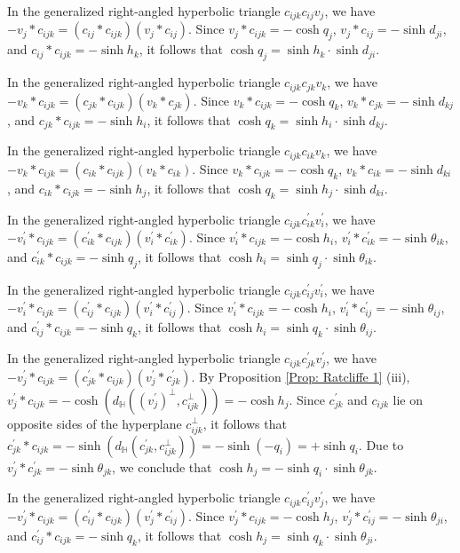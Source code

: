 \documentclass[12pt]{amsart}
\theoremstyle{definition}
\begin{document}
\begin{description}
In the generalized right-angled hyperbolic triangle $c_{ijk}c_{ij}v_j$,
we have $-v_j\ast c_{ijk}=(c_{ij}\ast c_{ijk})(v_j\ast c_{ij})$.
Since $v_j\ast c_{ijk}=-\cosh q_j$,
$v_j\ast c_{ij}=-\sinh d_{ji}$,
and $c_{ij}\ast c_{ijk}=-\sinh h_k$,
it follows that $\cosh q_j=\sinh h_k\cdot \sinh d_{ji}$.

In the generalized right-angled hyperbolic triangle $c_{ijk}c_{jk}v_k$,
we have $-v_k\ast c_{ijk}=(c_{jk}\ast c_{ijk})(v_k\ast c_{jk})$.
Since $v_k\ast c_{ijk}=-\cosh q_k$,
$v_k\ast c_{jk}=-\sinh d_{kj}$,
and $c_{jk}\ast c_{ijk}=-\sinh h_i$,
it follows that $\cosh q_k=\sinh h_i\cdot \sinh d_{kj}$.

In the generalized right-angled hyperbolic triangle $c_{ijk}c_{ik}v_k$,
we have $-v_k\ast c_{ijk}=(c_{ik}\ast c_{ijk})(v_k\ast c_{ik})$.
Since $v_k\ast c_{ijk}=-\cosh q_k$,
$v_k\ast c_{ik}=-\sinh d_{ki}$, and
$c_{ik}\ast c_{ijk}=-\sinh h_j$,
it follows that $\cosh q_k=\sinh h_j\cdot\sinh d_{ki}$.

In the generalized right-angled hyperbolic triangle $c_{ijk}c^\prime_{ik}v^\prime_i$,
we have $-v^\prime_i\ast c_{ijk}=(c^\prime_{ik}\ast c_{ijk})(v^\prime_i\ast c^\prime_{ik})$.
Since $v^\prime_i\ast c_{ijk}=-\cosh h_i$,
$v^\prime_i\ast c^\prime_{ik}=-\sinh \theta_{ik}$, and
$c^\prime_{ik}\ast c_{ijk}=-\sinh q_j$,
it follows that $\cosh h_i=\sinh q_j\cdot\sinh \theta_{ik}$.

In the generalized right-angled hyperbolic triangle $c_{ijk}c^\prime_{ij}v^\prime_i$,
we have $-v^\prime_i\ast c_{ijk}=(c^\prime_{ij}\ast c_{ijk})(v^\prime_i\ast c^\prime_{ij})$.
Since $v^\prime_i\ast c_{ijk}=-\cosh h_i$,
$v^\prime_i\ast c^\prime_{ij}=-\sinh \theta_{ij}$, and
$c^\prime_{ij}\ast c_{ijk}=-\sinh q_k$,
it follows that $\cosh h_i=\sinh q_k\cdot\sinh \theta_{ij}$.

In the generalized right-angled hyperbolic triangle $c_{ijk}c^\prime_{jk}v^\prime_j$,
we have $-v^\prime_j\ast c_{ijk}=(c^\prime_{jk}\ast c_{ijk})(v^\prime_j\ast c^\prime_{jk})$.
By Proposition \ref{Prop: Ratcliffe 1} (iii),
$v^\prime_j\ast c_{ijk}
=-\cosh(d_\mathbb{H}((v^\prime_j)^\bot,c_{ijk}^\bot))
=-\cosh h_j$.
Since $c^\prime_{jk}$ and $c_{ijk}$ lie on opposite sides of the hyperplane $c_{ijk}^\bot$, 
it follows that $c^\prime_{jk}\ast c_{ijk}=-\sinh(d_\mathbb{H}(c^\prime_{jk},c_{ijk}^\bot))=-\sinh (-q_i)=+\sinh q_i$.
Due to $v^\prime_j\ast c^\prime_{jk}=-\sinh \theta_{jk}$,
we conclude that $\cosh h_j=-\sinh q_i\cdot\sinh \theta_{jk}$.

In the generalized right-angled hyperbolic triangle $c_{ijk}c^\prime_{ij}v^\prime_j$,
we have $-v^\prime_j\ast c_{ijk}=(c^\prime_{ij}\ast c_{ijk})(v^\prime_j\ast c^\prime_{ij})$.
Since $v^\prime_j\ast c_{ijk}=-\cosh h_j$,
$v^\prime_j\ast c^\prime_{ij}=-\sinh \theta_{ji}$, and
$c^\prime_{ij}\ast c_{ijk}=-\sinh q_k$,
it follows that $\cosh h_j=\sinh q_k\cdot\sinh \theta_{ji}$.


\end{description}
\end{document}
